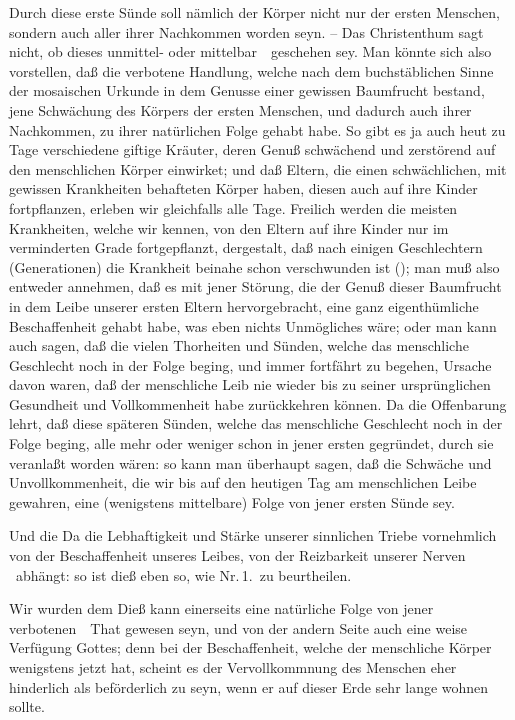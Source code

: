 \begin{aufza}
\item Durch diese erste Sünde soll nämlich der Körper nicht nur der ersten Menschen, sondern auch aller ihrer Nachkommen  worden seyn. -- Das Christenthum sagt nicht, ob dieses unmittel- oder mittelbar~\ geschehen sey. Man könnte sich also vorstellen, daß die verbotene Handlung, welche nach dem buchstäblichen Sinne der mosaischen Urkunde in dem Genusse einer gewissen Baumfrucht bestand, jene Schwächung des Körpers der ersten Menschen, und dadurch auch ihrer Nachkommen, zu ihrer natürlichen Folge gehabt habe. So gibt es ja auch heut zu Tage verschiedene giftige Kräuter, deren Genuß schwächend und zerstörend auf den menschlichen Körper einwirket; und daß Eltern, die einen schwächlichen, mit gewissen Krankheiten behafteten Körper haben, diesen auch auf ihre Kinder fortpflanzen, erleben wir gleichfalls alle Tage. Freilich werden die meisten Krankheiten, welche wir kennen, von den Eltern auf ihre Kinder nur im verminderten Grade fortgepflanzt, dergestalt, daß nach einigen Geschlechtern (Generationen) die Krankheit beinahe schon verschwunden ist (); man muß also entweder annehmen, daß es mit jener Störung, die der Genuß dieser Baumfrucht in dem Leibe unserer ersten Eltern hervorgebracht, eine ganz eigenthümliche Beschaffenheit gehabt habe, was eben nichts Unmögliches wäre; oder man kann auch sagen, daß die vielen Thorheiten und Sünden, welche das menschliche Geschlecht noch in der Folge beging, und immer fortfährt zu begehen, Ursache davon waren, daß der menschliche Leib nie wieder bis zu seiner ursprünglichen Gesundheit und Vollkommenheit habe zurückkehren können. Da die Offenbarung lehrt, daß diese späteren Sünden, welche das menschliche Geschlecht noch in der Folge beging, alle mehr oder weniger schon in jener ersten gegründet, durch sie veranlaßt worden wären: so kann man überhaupt sagen, daß die Schwäche und Unvollkommenheit, die wir bis auf den heutigen Tag am menschlichen Leibe gewahren, eine (wenigstens mittelbare) Folge von jener ersten Sünde sey.
\item Und die  Da die Lebhaftigkeit und Stärke unserer sinnlichen Triebe vornehmlich von der Beschaffenheit unseres Leibes, von der Reizbarkeit unserer Nerven \usw\ abhängt: so ist dieß eben so, wie Nr.\,1.\ zu beurtheilen.
\item Wir wurden dem  Dieß kann einerseits eine natürliche Folge von jener verbotenen~\ That gewesen seyn, und von der andern Seite auch eine weise Verfügung Gottes; denn bei der Beschaffenheit, welche der menschliche Körper wenigstens jetzt hat, scheint es der Vervollkommnung des Menschen eher hinderlich als beförderlich zu seyn, wenn er auf dieser Erde sehr lange wohnen sollte.

\end{aufza}
